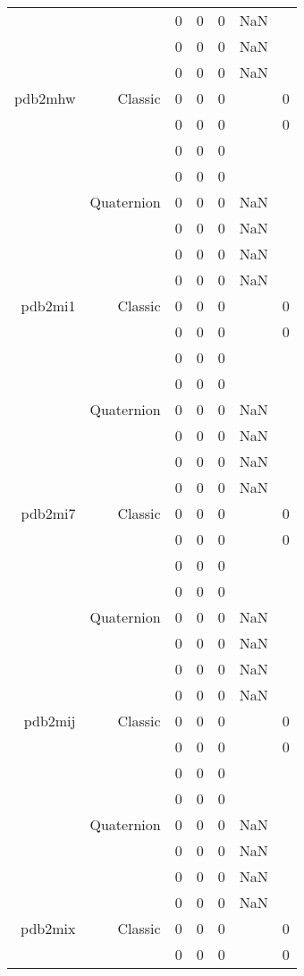 \begin{xltabular}{\textwidth}{r|rcccSc}
& & 0 & 0 & 0 & NaN & \\
& & 0 & 0 & 0 & NaN & \\
& & 0 & 0 & 0 & NaN & \\ \addlinespace
pdb2mhw & Classic & 0 & 0 & 0 & & 0 \\
& & 0 & 0 & 0 & & 0 \\
& & 0 & 0 & 0 & & \\
& & 0 & 0 & 0 & & \\
& Quaternion & 0 & 0 & 0 & NaN & \\
& & 0 & 0 & 0 & NaN & \\
& & 0 & 0 & 0 & NaN & \\
& & 0 & 0 & 0 & NaN & \\ \addlinespace
pdb2mi1 & Classic & 0 & 0 & 0 & & 0 \\
& & 0 & 0 & 0 & & 0 \\
& & 0 & 0 & 0 & & \\
& & 0 & 0 & 0 & & \\
& Quaternion & 0 & 0 & 0 & NaN & \\
& & 0 & 0 & 0 & NaN & \\
& & 0 & 0 & 0 & NaN & \\
& & 0 & 0 & 0 & NaN & \\ \addlinespace
pdb2mi7 & Classic & 0 & 0 & 0 & & 0 \\
& & 0 & 0 & 0 & & 0 \\
& & 0 & 0 & 0 & & \\
& & 0 & 0 & 0 & & \\
& Quaternion & 0 & 0 & 0 & NaN & \\
& & 0 & 0 & 0 & NaN & \\
& & 0 & 0 & 0 & NaN & \\
& & 0 & 0 & 0 & NaN & \\ \addlinespace
pdb2mij & Classic & 0 & 0 & 0 & & 0 \\
& & 0 & 0 & 0 & & 0 \\
& & 0 & 0 & 0 & & \\
& & 0 & 0 & 0 & & \\
& Quaternion & 0 & 0 & 0 & NaN & \\
& & 0 & 0 & 0 & NaN & \\
& & 0 & 0 & 0 & NaN & \\
& & 0 & 0 & 0 & NaN & \\ \addlinespace
pdb2mix & Classic & 0 & 0 & 0 & & 0 \\
& & 0 & 0 & 0 & & 0 \\

\end{xltabular}
